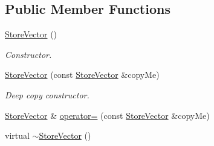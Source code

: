 \subsection*{Public Member Functions}
\begin{DoxyCompactItemize}
\item 
\hypertarget{class_store_vector_ad9b7abbc4e1dc4b1107ca08427a58a08}{
\hyperlink{class_store_vector_ad9b7abbc4e1dc4b1107ca08427a58a08}{StoreVector} ()}
\label{class_store_vector_ad9b7abbc4e1dc4b1107ca08427a58a08}

\begin{DoxyCompactList}\small\item\em Constructor. \item\end{DoxyCompactList}\item 
\hyperlink{class_store_vector_a0e2187ce207205c0815e3419b31e2ac6}{StoreVector} (const \hyperlink{class_store_vector}{StoreVector} \&copyMe)
\begin{DoxyCompactList}\small\item\em Deep copy constructor. \item\end{DoxyCompactList}\item 
\hyperlink{class_store_vector}{StoreVector} \& \hyperlink{class_store_vector_a13901ff5acda2503b3e28b4b5512b97a}{operator=} (const \hyperlink{class_store_vector}{StoreVector} \&copyMe)
\item 
\hypertarget{class_store_vector_a63f709aa54ffd7a991a2c0367adb8ca2}{
virtual \hyperlink{class_store_vector_a63f709aa54ffd7a991a2c0367adb8ca2}{$\sim$StoreVector} ()}
\label{class_store_vector_a63f709aa54ffd7a991a2c0367adb8ca2}


\end{DoxyCompactItemize}

